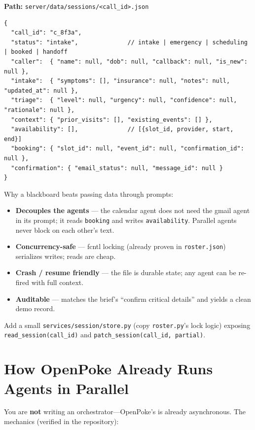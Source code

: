\documentclass[11pt,a4paper]{article}
\begin{document}
\textbf{Path:} \texttt{server/data/sessions/<call\_id>.json}

\begin{lstlisting}[language=jsonc]
{
  "call_id": "c_8f3a",
  "status": "intake",              // intake | emergency | scheduling | booked | handoff
  "caller":  { "name": null, "dob": null, "callback": null, "is_new": null },
  "intake":  { "symptoms": [], "insurance": null, "notes": null, "updated_at": null },
  "triage":  { "level": null, "urgency": null, "confidence": null, "rationale": null },
  "context": { "prior_visits": [], "existing_events": [] },
  "availability": [],              // [{slot_id, provider, start, end}]
  "booking": { "slot_id": null, "event_id": null, "confirmation_id": null },
  "confirmation": { "email_status": null, "message_id": null }
}
\end{lstlisting}

Why a blackboard beats passing data through prompts:

\begin{itemize}[leftmargin=*]
  \item \textbf{Decouples the agents} --- the calendar agent does not need the gmail agent in its prompt; it
  reads \texttt{booking} and writes \texttt{availability}. Parallel agents never block on each other's text.
  \item \textbf{Concurrency-safe} --- fcntl locking (already proven in \texttt{roster.json}) serializes writes;
  reads are cheap.
  \item \textbf{Crash / resume friendly} --- the file is durable state; any agent can be re-fired with full context.
  \item \textbf{Auditable} --- matches the brief's ``confirm critical details'' and yields a clean demo record.
\end{itemize}

\noindent Add a small \texttt{services/session/store.py} (copy \texttt{roster.py}'s lock logic) exposing
\texttt{read\_session(call\_id)} and \texttt{patch\_session(call\_id, partial)}.

\section{How OpenPoke Already Runs Agents in Parallel}

You are \textbf{not} writing an orchestrator---OpenPoke's is already asynchronous. The mechanics (verified in
the repository):
\end{document}
